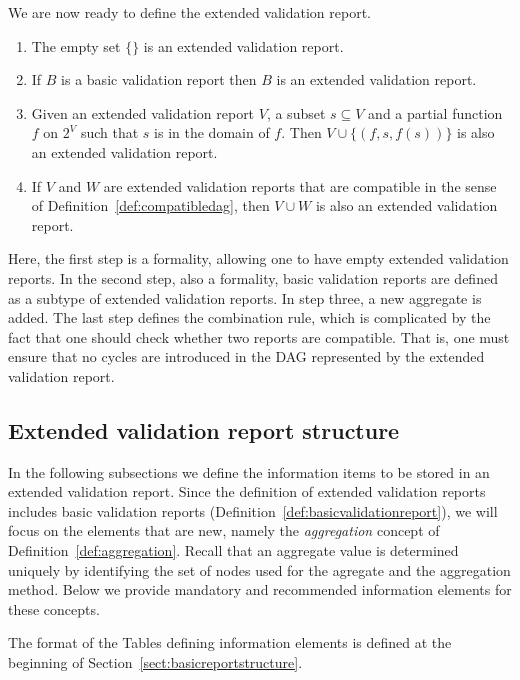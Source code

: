 We are now ready to define the extended validation report.
%
\begin{definition}\leavevmode
\label{def:extvalrep}
\begin{enumerate}
\item The empty set $\{\}$ is an extended validation report.
\item If $B$ is a basic validation report then $B$ is an extended validation report.
\item Given an extended validation report $V$, a subset $s\subseteq V$ and a
partial function $f$ on $2^V$ such that $s$ is in the domain of
$f$.  Then  $V\cup \{(f,s,f(s))\}$ is also an extended validation report. 
\item If $V$ and $W$ are extended validation reports that are compatible
in the sense of Definition~\ref{def:compatibledag}, then $V\cup W$ is
also an extended validation report.
\end{enumerate}
\end{definition}
Here, the first step is a formality, allowing one to have empty extended
validation reports. In the second step, also a formality, basic validation
reports are defined as a subtype of extended validation reports.  In step
three, a new aggregate is added.  The last step defines the combination rule,
which is complicated by the fact that one should check whether two reports are
compatible. That is, one must ensure that no cycles are introduced in the DAG
represented by the extended validation report.



\subsection{Extended validation report structure}
\label{sect:extendedreport}
In the following subsections we define the information items to be stored in an
extended validation report. Since the definition of extended validation reports
includes basic validation reports (Definition~\ref{def:basicvalidationreport}),
we will focus on the elements that are new, namely the \emph{aggregation}
concept of Definition~\ref{def:aggregation}.  Recall that an aggregate value is
determined uniquely by identifying the set of nodes used for the agregate and
the aggregation method. Below we provide mandatory and recommended information
elements for these concepts.

The format of the Tables defining information elements is defined at the
beginning of Section~\ref{sect:basicreportstructure}.


